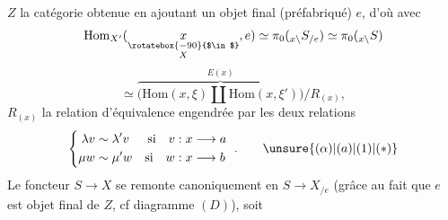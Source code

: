 $Z$ la catégorie obtenue en ajoutant un objet final (préfabriqué) $e$, d'où
avec
\[
 \mathrm{Hom}_{X'}(\underset{\substack{\rotatebox{-90}{$\in$}\\ X}}{x},e)\simeq
 \pi_0({}_{x\backslash}S_{/e})\simeq\pi_0({}_{x\backslash}S)
\]
\[
 \simeq\overbrace{\bigl(\mathrm{Hom}(x,\xi)\amalg\mathrm{Hom}(x,\xi')\bigr)}^{E(x)}/R_{(x)},
\]
$R_{(x)}$ la relation d'équivalence engendrée par les deux relations
\[
 \left\{\begin{aligned}
 \lambda v&\sim\lambda'v&\text{si}\quad v &:x\longrightarrow a\\
 \mu w&\sim\mu'w&\text{si}\quad w &:x\longrightarrow b
 \end{aligned}\right. \ . \tag*{$\unsure{(\alpha)|(a)|(1)|(*)}$}
\]
Le foncteur $S\longrightarrow X$ se remonte canoniquement en $S\longrightarrow X_{/e}$ (grâce au fait que $e$ est objet final de $Z$, cf diagramme $(D)$), soit

